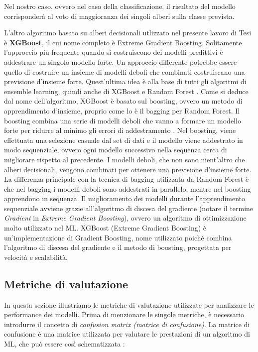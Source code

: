 Nel nostro caso, ovvero nel caso della classificazione, il risultato del modello corrisponder\`a al voto di maggioranza dei singoli alberi sulla classe prevista.

\vspace{1.7cm}

L'altro algoritmo basato su alberi decisionali utlizzato nel presente lavoro di Tesi \`e \textbf{XGBoost}, il cui nome completo \`e Extreme Gradient Boosting. Solitamente l'approccio pi\`u frequente quando si costruiscono dei modelli predittivi \`e addestrare un singolo modello forte. Un approccio differente potrebbe essere quello di costruire un insieme di modelli deboli che combinati costruiscano una previsione d'insieme forte. Quest'ultima idea \`e alla base di tutti gli algoritmi di ensemble learning, quindi anche di XGBoost e Random Forest \cite{gradient_boost}.
Come si deduce dal nome dell'algoritmo, XGBoost \`e basato sul boosting, ovvero un metodo di apprendimento d'insieme, proprio come lo \`e il bagging per Random Forest. Il boosting combina una serie di modelli deboli che vanno a formare un modello forte per ridurre al minimo gli errori di addestramento \cite{xgb}. Nel boosting, viene effettuata una selezione casuale dal set di dati e il modello viene addestrato in modo sequenziale, ovvero ogni modello successivo nella sequenza cerca di migliorare rispetto al precedente. I modelli deboli, che non sono nient'altro che alberi decisionali, vengono combinati per ottenere una previsione d'insieme forte. La differenza principale con la tecnica di bagging utilizzata da Random Forest \`e che nel bagging i modelli deboli sono addestrati in parallelo, mentre nel boosting apprendono in sequenza. Il miglioramento dei modelli durante l'apprendimento sequenziale avviene grazie all'algoritmo di discesa del gradiente (notare il termine \textit{Gradient} in  \textit{Extreme Gradient Boosting}), ovvero un algoritmo di ottimizzazione molto utilizzato nel ML.
XGBoost (Extreme Gradient Boosting) \`e un'implementazione di Gradient Boosting, nome utilizzato poich\'e combina l'algoritmo di discesa del gradiente e il metodo di boosting, progettata per velocit\`a e scalabilit\`a.


\subsection{Metriche di valutazione}
In questa sezione illustriamo le metriche di valutazione utilizzate per analizzare le performance dei modelli. Prima di menzionare le singole metriche, \`e necessario introdurre il concetto di \textit{confusion matrix (matrice di confusione)}. La matrice di confusione \`e una matrice utilizzata per valutare le prestazioni di un algoritmo di ML, che pu\`o essere cos\`i schematizzata \cite{mcc}:

